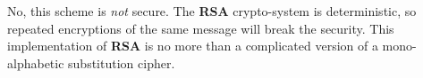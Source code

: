 \documentclass[../CryptoHW3.tex]{subfiles}
\begin{document}
\begin{flushleft}



  No, this scheme is \emph{not} secure.  The \textbf{RSA} crypto-system is deterministic, so repeated encryptions of the same message will break the security.  This implementation of \textbf{RSA} is no more than a complicated version of a mono-alphabetic substitution cipher.



\end{flushleft}
\end{document}
